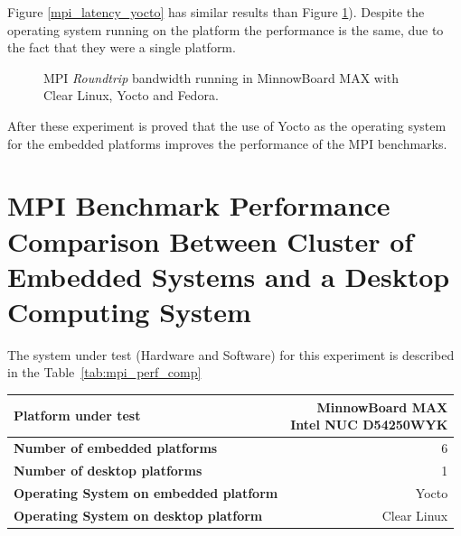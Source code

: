 Figure \ref{mpi_latency_yocto} has similar results than Figure
\ref{mpi_roundtrip_yocto}). Despite the operating system running on the platform
the performance is the same, due to the fact that they were a single platform.


\begin{figure}[H]
\begin{center}
\end{center}
\caption{MPI \textit{Roundtrip} bandwidth running in  MinnowBoard MAX  with Clear Linux,
Yocto and Fedora.}
\label{mpi_roundtrip_yocto}
\end{figure}

After these experiment is proved that the use of Yocto as the operating system
for the embedded platforms improves the performance of the MPI benchmarks. 

\section{MPI Benchmark Performance Comparison Between Cluster of Embedded
Systems and a Desktop Computing System}

The system under test (Hardware and Software) for this experiment is described
in the Table~\ref{tab:mpi_perf_comp}
    
    \begin{center}
    \begin{tabular}{ | l | r |}
        \hline
        \textbf{Platform under test} & \shortstack{MinnowBoard MAX \\  Intel  NUC D54250WYK } \\ \hline
        \textbf{Number of embedded platforms}  & 6  \\ \hline
        \textbf{Number of desktop platforms}  & 1  \\ \hline
        \textbf{Operating System on embedded platform} & Yocto  \\ \hline
        \textbf{Operating System on desktop platform} & Clear Linux  \\ \hline
    \end{tabular}
    \label{tab:mpi_perf_comp}
    \end{center}

